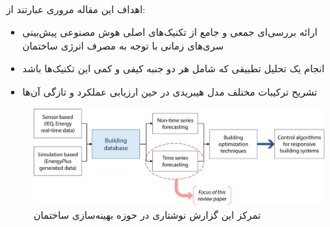 \\[3em]
\noindent
اهداف این مقاله مروری عبارتند از:
\begin{itemize}
    \item ارائه بررسی‌ای جمعی و جامع از تکنیک‌های اصلی هوش مصنوعی پیش‌بینی سری‌های ‌ز‌‌مانی با توجه به مصرف انرژی ساختمان
    \item انجام یک تحلیل تطبیقی که شامل هر دو جنبه کیفی و کمی این تکنیک‌ها باشد
    \item تشریح ترکیبات مختلف مدل هیبریدی در حین ارزیابی عملکرد و تازگی آن‌ها
\end{itemize}

\begin{figure}[ht!]
    \begin{center}
        \includegraphics[width=14cm]{images/illustration.jpg}
    \end{center}
    \caption[‌اهمیت پیش‌بینی انرژی ساختمان‌ها برای بهینه سازی ساختمان‌ها]{تمرکز این گزارش نوشتاری در حوزه بهینه‌سازی ساختمان
     \cite{DEB2017902}}
    \label{fig:dc}
    \end{figure}